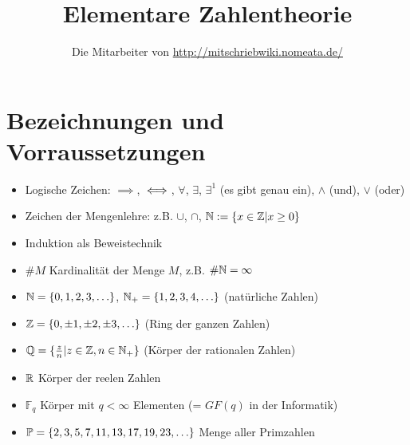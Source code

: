\documentclass[a4paper,twoside,DIV15,BCOR12mm]{scrbook}
\author{Die Mitarbeiter von \url{http://mitschriebwiki.nomeata.de/}}
\title{Elementare Zahlentheorie}
\begin{document}
\maketitle

\renewcommand{\thechapter}{\roman{chapter}}
 \tableofcontents


\chapter*{Bezeichnungen und Vorraussetzungen}
\begin{itemize}
\item Logische Zeichen: $\implies$, $\iff$, $\forall$, $\exists$, $\exists^1$ (es gibt genau ein), $\wedge$ (und), $\vee$ (oder)
\item Zeichen der Mengenlehre: z.B. $\cup$, $\cap$, $\mathbb{N} := \{x\in \mathbb{Z}| x \ge 0 \}$
\item Induktion als Beweistechnik
\item $\#M$ Kardinalität der Menge $M$, z.B. $\#\mathbb{N} = \infty$
\item $\mathbb{N} = \{0,1,2,3,\ldots\}$, $\mathbb{N}_+ = \{1,2,3,4,\ldots\}$ (natürliche Zahlen)
\item $\mathbb{Z} = \{0, \pm1, \pm2, \pm3, \ldots \}$ (Ring der ganzen Zahlen)
\item $\mathbb{Q} = \{\frac z n| z\in \mathbb{Z}, n\in \mathbb{N}_+\}$ (Körper der rationalen Zahlen)
\item $\mathbb{R}$ Körper der reelen Zahlen
\item $\mathbb{F}_q$ Körper mit $q<\infty$ Elementen (= $GF(q)$ in der Informatik)
\item $\mathbb{P} = \{ 2,3,5,7,11,13,17,19,23,\ldots\}$ Menge aller Primzahlen
\end{itemize}

\setcounter{chapter}{0}
\renewcommand{\thechapter}{\arabic{chapter}}









\end{document}

